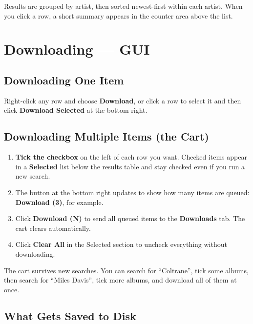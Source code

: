 \documentclass[11pt,a4paper]{article}
\begin{document}
Results are grouped by artist, then sorted newest-first within each artist.
When you click a row, a short summary appears in the counter area above
the list.

\section{Downloading --- GUI}

\subsection{Downloading One Item}

Right-click any row and choose \textbf{Download}, or click a row to select it
and then click \textbf{Download Selected} at the bottom right.

\subsection{Downloading Multiple Items (the Cart)}

\begin{enumerate}
  \item \textbf{Tick the checkbox} on the left of each row you want.  Checked
        items appear in a \textbf{Selected} list below the results table and
        stay checked even if you run a new search.
  \item The button at the bottom right updates to show how many items are
        queued: \textbf{Download (3)}, for example.
  \item Click \textbf{Download (N)} to send all queued items to the
        \textbf{Downloads} tab.  The cart clears automatically.
  \item Click \textbf{Clear All} in the Selected section to uncheck everything
        without downloading.
\end{enumerate}

\begin{tipbox}
The cart survives new searches.  You can search for ``Coltrane'', tick some
albums, then search for ``Miles Davis'', tick more albums, and download all of
them at once.
\end{tipbox}

\subsection{What Gets Saved to Disk}
\end{document}
